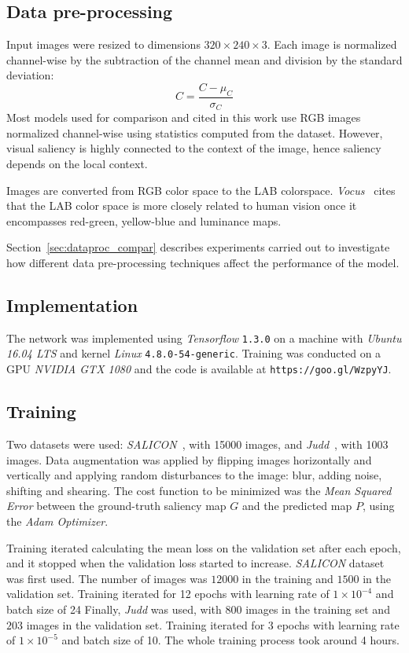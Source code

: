 \documentclass[10pt,twocolumn,letterpaper]{article}
\begin{document}
\subsection{Data pre-processing}
Input images were resized to dimensions $320\times240\times3$.
Each image is normalized channel-wise by the subtraction of
the channel mean and division by the standard deviation:
$$C = \frac{C - \mu_C}{\sigma_C}$$
Most models used for comparison and cited in this work use RGB images
normalized channel-wise using statistics computed from the dataset.
However, visual saliency is highly connected to the context of the
image, hence saliency depends on the local context.

Images are converted from RGB color space to the LAB colorspace.
\emph{Vocus}~\cite{frintrop_2005} cites that the
LAB color space is more closely related to human vision once it encompasses
red-green, yellow-blue and
luminance maps.

Section~\ref{sec:dataproc_compar} describes experiments carried out
to investigate how different data pre-processing techniques affect the
performance of the model.

\subsection{Implementation}
The network was implemented using \emph{Tensorflow} \texttt{1.3.0}
on a machine with \emph{Ubuntu 16.04 LTS} and
kernel \emph{Linux} \texttt{4.8.0-54-generic}.
Training was conducted on a GPU \emph{NVIDIA GTX 1080} and the
code is available at \texttt{https://goo.gl/WzpyYJ}.

\subsection{Training}
Two datasets were used:
\emph{SALICON}~\cite{jiang_2015}, with 15000 images, and
\emph{Judd}~\cite{judd}, with 1003 images.
Data augmentation was applied by flipping images
horizontally and vertically and applying random disturbances to the image:
blur, adding noise, shifting and shearing.
The cost function to be minimized was the \emph{Mean Squared Error} between
the ground-truth saliency map $G$ and the predicted map $P$, using
the \emph{Adam Optimizer}.

Training iterated calculating the mean loss on the validation set
after each epoch, and it stopped when the validation loss started to increase.
\emph{SALICON} dataset was first used.
The number of images was $12000$ in the training and $1500$ in the validation set.
Training iterated for 12 epochs with learning rate of $1\times10^{-4}$
and batch size of 24
Finally, \emph{Judd} was used, with $800$ images in the training set
and $203$ images in the validation set.
Training iterated for 3 epochs with learning rate of $1\times10^{-5}$
and batch size of 10.
The whole training process took around 4 hours.
\end{document}
